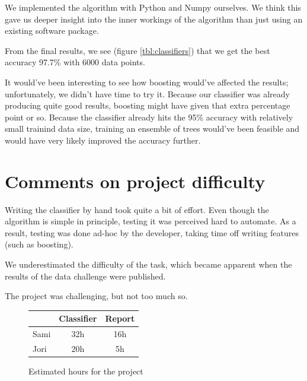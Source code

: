 \documentclass[a4paper,10pt]{article}
\begin{document}
We implemented the algorithm with Python and Numpy ourselves.  We think
this gave us deeper insight into the inner workings of the algorithm
than just using an existing software package.

From the final results, we see (figure \ref{tbl:classifiers}) that we
get the best accuracy 97.7\% with 6000 data points.

It would've been interesting to see how
boosting\cite[p. 360]{alpaydin2004} would've affected the results;
unfortunately, we didn't have time to try it.  Because our classifier
was already producing quite good results, boosting might have given that
extra percentage point or so.  Because the classifier already hits the
95\% accuracy with relatively small trainind data size, training an
ensemble of trees would've been feasible and would have very likely
improved the accuracy further.

\section{Comments on project difficulty}

Writing the classifier by hand took quite a bit of effort.  Even though
the algorithm is simple in principle, testing it was perceived hard to
automate.  As a result, testing was done ad-hoc by the developer, taking
time off writing features (such as boosting).

We underestimated the difficulty of the task, which became apparent when
the results of the data challenge were published.

The project was challenging, but not too much so.

\begin{figure}
  \centering
\begin{tabular}{|l|c|c|}
\hline
 & Classifier & Report \\ \hline
Sami & 32h & 16h \\ %
Jori & 20h & 5h  \\ %
\hline
\end{tabular}
  \caption{Estimated hours for the project}
  \label{tbl:effort-estimate} 
\end{figure}
\end{document}
